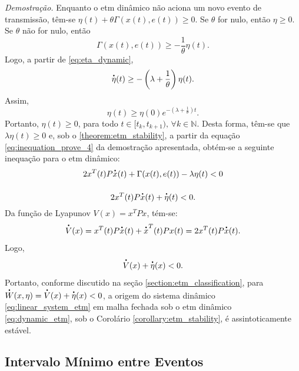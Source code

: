 \noindent \textit{Demostração.} Enquanto o \acrshort{etm} dinâmico não aciona um novo evento de transmissão, têm-se $\eta(t) + \theta \Gamma(x(t), e(t)) \geq 0$. Se $\theta$ for nulo, então $\eta \geq 0$. Se $\theta$ não for nulo, então \begin{equation}
  \Gamma(x(t), e(t)) \geq - \frac{1}{\theta}\eta(t).
\end{equation} Logo, a partir de \eqref{eq:eta_dynamic},  \begin{equation}
  \dt{\eta}(t) \geq - \left(\lambda + \frac{1}{\theta}\right) \eta(t).
\end{equation} Assim, \begin{equation}
  \eta(t) \geq \eta(0) e ^ {-\left(\lambda + \frac{1}{\theta}\right) t}.
\end{equation} Portanto, $\eta(t) \geq 0$, para todo $t \in [t_k, t_{k+1}), \, \forall k \in \mathbb{N}$. Desta forma, têm-se que $\lambda \eta(t) \geq 0$ e, sob o \autoref{theorem:etm_stability}, a partir da equação \eqref{eq:inequation_prove_4} da demostração apresentada, obtém-se a seguinte inequação para o \acrshort{etm} dinâmico: \begin{gather}
  2x^T(t) P\dt{x}(t) + \Gamma(x(t), e(t)) - \lambda \eta(t) < 0 \notag \\[12pt]
  2x^T(t) P\dt{x}(t) + \dt{\eta}(t) < 0.
\end{gather} Da função de Lyapunov $V(x) = x^TPx$, tém-se: \begin{equation}\dt{V}(x) = x^T(t)P\dt{x}(t) + \dt{x}^T(t)Px(t) = 2x^T(t) P\dt{x}(t).\end{equation} Logo, \begin{equation}
  \dt{V}(x) + \dt{\eta}(x) < 0.
\end{equation} Portanto, conforme discutido na seção \ref{section:etm_classification}, para $\dt{W}(x, \eta) = \dt{V}(x) + \dt{\eta}(x) < 0$, a origem do sistema dinâmico \eqref{eq:linear_system_etm} em malha fechada sob o \acrshort{etm} dinâmico \eqref{eq:dynamic_etm}, sob o Corolário \ref{corollary:etm_stability}, é assintoticamente estável.

\subsection{Intervalo Mínimo entre Eventos}


